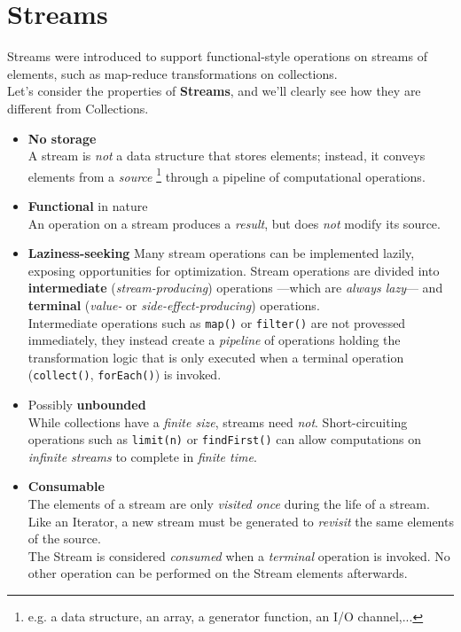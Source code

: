 \chapter{Streams}

Streams were introduced to support functional-style operations on streams of elements, such as map-reduce transformations on collections.\\
Let's consider the properties of \textbf{Streams}, and we'll clearly see how they are different from Collections.
\begin{itemize}
   \item \textbf{No storage}\\
   A stream is \textit{not} a data structure that
   stores elements; instead, it conveys elements
   from a \textit{source} \footnote{e.g. a data structure, an array, a
   generator function, an I/O channel,...} through a pipeline of computational operations.
   \item \textbf{Functional} in nature\\
   An operation on a stream produces a \textit{result}, but does \textit{not} modify its source.
   \item \textbf{Laziness-seeking}
   Many stream operations can be
   implemented lazily, exposing opportunities for optimization.
   Stream operations are divided into \textbf{intermediate} 
   (\textit{stream-producing}) operations {---}which are \textit{always lazy}{---} and
   \textbf{terminal}
   (\textit{value- }or \textit{side-effect-producing}) operations.\\
   Intermediate operations such as \lstinline|map()| or \lstinline|filter()| are not provessed immediately, they instead create a \textit{pipeline} of operations holding the transformation logic that is only executed when a terminal operation (\lstinline|collect()|, \lstinline|forEach()|) is invoked.
   \item Possibly \textbf{unbounded}\\
   While collections have a \textit{finite size}, streams need \textit{not}.
   Short-circuiting operations such as \lstinline|limit(n)| or
   \lstinline|findFirst()| can allow computations on \textit{infinite streams} to
   complete in \textit{finite time}.
   \item \textbf{Consumable}\\
   The elements of a stream are only \textit{visited once}
   during the life of a stream. 
   Like an Iterator, a new stream must be generated to \textit{revisit} the same elements of the source.\\
   The Stream is considered \textit{consumed} when a \textit{terminal}
   operation is invoked. 
   No other operation can be performed on
   the Stream elements afterwards.
\end{itemize} 
